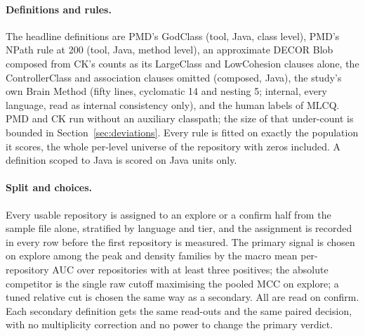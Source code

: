\documentclass[11pt,a4paper]{article}
\begin{document}
\paragraph{Definitions and rules.} The headline definitions are PMD's GodClass
(tool, Java, class level), PMD's NPath rule at 200 \cite{nejmeh1988} (tool,
Java, method level), an approximate DECOR Blob composed from CK's counts
\cite{cktool} as its LargeClass and LowCohesion clauses alone, the
ControllerClass and association clauses omitted (composed, Java), the study's
own Brain Method (fifty lines, cyclomatic 14 and nesting 5; internal, every
language, read as internal consistency only), and the human labels of MLCQ.
PMD and CK run without an auxiliary classpath; the size of that under-count is
bounded in Section~\ref{sec:deviations}. Every rule is fitted on exactly the
population it scores, the whole per-level universe of the repository with
zeros included. A definition scoped to Java is scored on Java units only.

\paragraph{Split and choices.} Every usable repository is assigned to an
explore or a confirm half from the sample file alone, stratified by language
and tier, and the assignment is recorded in every row before the first
repository is measured. The primary signal is chosen on explore among the peak
and density families by the macro mean per-repository AUC over repositories
with at least three positives; the absolute competitor is the single raw cutoff
maximising the pooled MCC on explore; a tuned relative cut is chosen the same
way as a secondary. All are read on confirm. Each secondary definition gets
the same read-outs and the same paired decision, with no multiplicity
correction and no power to change the primary verdict.
\end{document}
